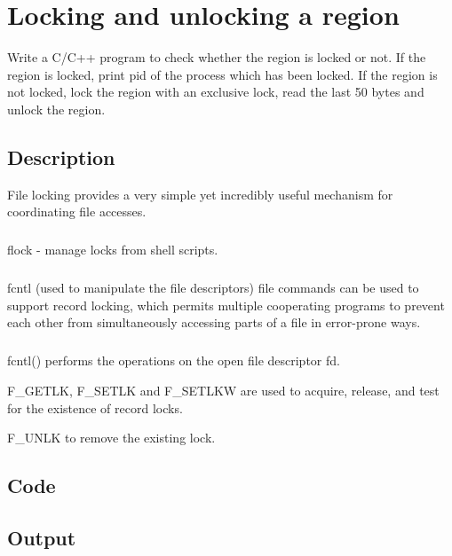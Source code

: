 \chapter{Locking and unlocking a region}

Write a C/C++ program to check whether the region is locked or not. If the region is locked, print pid of the process which has been locked. If the region is not locked, lock the region with an exclusive lock, read the last 50 bytes and unlock the region.

\section{Description}
File locking provides a very simple yet incredibly useful mechanism for coordinating file accesses.

\paragraph{}
flock - manage locks from shell scripts.

\paragraph{}
fcntl (used to manipulate the file descriptors) file commands can be used to support record locking, which permits multiple cooperating programs to prevent each other from simultaneously accessing parts of a file in error-prone ways.

\paragraph{}
fcntl() performs the operations on the open file descriptor fd.

\begin{description}
\item F\_GETLK, F\_SETLK and F\_SETLKW are used to acquire, release, and test for the existence of record locks. 
\item F\_UNLK to remove the existing lock.
\end{description}

\section{Code}



\section{Output}

